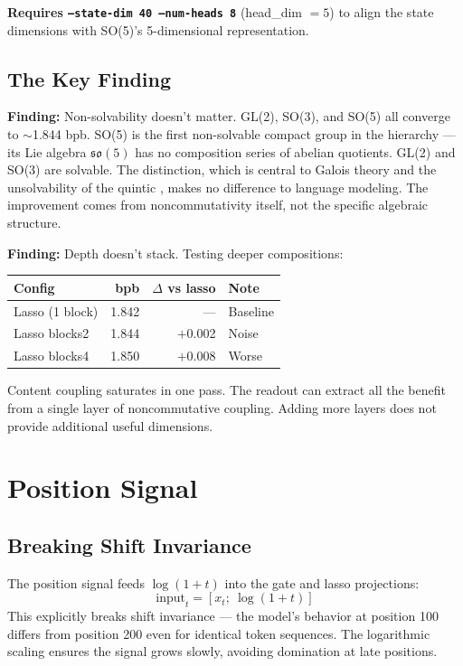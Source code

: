 \documentclass[11pt,a4paper]{report}
\newcommand{\finding}[1]{\textcolor{finding}{\textbf{Finding:}} #1}
\begin{document}
\textbf{Requires \texttt{--state-dim 40 --num-heads 8}} (head\_dim $= 5$) to align the state dimensions with SO(5)'s 5-dimensional representation.

\section{The Key Finding}

\finding{Non-solvability doesn't matter. GL(2), SO(3), and SO(5) all converge to $\sim$1.844 bpb.} SO(5) is the first non-solvable compact group in the hierarchy \cite{abel} --- its Lie algebra $\mathfrak{so}(5)$ has no composition series of abelian quotients. GL(2) and SO(3) are solvable. The distinction, which is central to Galois theory and the unsolvability of the quintic \cite{cayley}, makes no difference to language modeling. The improvement comes from noncommutativity itself, not the specific algebraic structure.

\finding{Depth doesn't stack.} Testing deeper compositions:

\begin{center}
\begin{tabular}{lrrl}
\toprule
Config & bpb & $\Delta$ vs lasso & Note \\
\midrule
Lasso (1 block) & 1.842 & --- & Baseline \\
Lasso blocks2 & 1.844 & $+$0.002 & Noise \\
Lasso blocks4 & 1.850 & $+$0.008 & Worse \\
\bottomrule
\end{tabular}
\end{center}

Content coupling saturates in one pass. The readout can extract all the benefit from a single layer of noncommutative coupling. Adding more layers does not provide additional useful dimensions.


\chapter{Position Signal}

\section{Breaking Shift Invariance}

The position signal feeds $\log(1 + t)$ into the gate and lasso projections:
\[
\text{input}_t = [x_t;\ \log(1 + t)]
\]
This explicitly breaks shift invariance --- the model's behavior at position 100 differs from position 200 even for identical token sequences. The logarithmic scaling ensures the signal grows slowly, avoiding domination at late positions.
\end{document}
